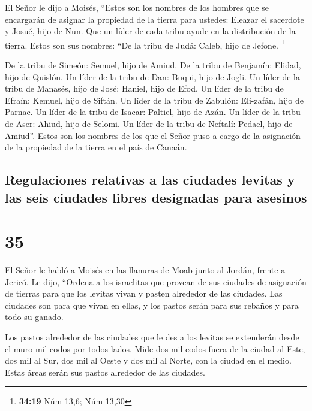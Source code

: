  El Señor le dijo a Moisés,  ``Estos son
los nombres de los hombres que se encargarán de asignar la propiedad de
la tierra para ustedes: Eleazar el sacerdote y Josué, hijo de Nun.
 Que un líder de cada tribu ayude en la distribución de
la tierra.  Estos son sus nombres: ``De la tribu de Judá:
Caleb, hijo de Jefone. \footnote{\textbf{34:19} Núm 13,6; Núm 13,30}

 De la tribu de Simeón: Semuel, hijo de Amiud.
 De la tribu de Benjamín: Elidad, hijo de Quislón.
 Un líder de la tribu de Dan: Buqui, hijo de Jogli.
 Un líder de la tribu de Manasés, hijo de José: Haniel,
hijo de Efod.  Un líder de la tribu de Efraín: Kemuel,
hijo de Siftán.  Un líder de la tribu de Zabulón:
Eli-zafán, hijo de Parnac.  Un líder de la tribu de
Isacar: Paltiel, hijo de Azán.  Un líder de la tribu de
Aser: Ahiud, hijo de Selomi.  Un líder de la tribu de
Neftalí: Pedael, hijo de Amiud''.  Estos son los nombres
de los que el Señor puso a cargo de la asignación de la propiedad de la
tierra en el país de Canaán.

\hypertarget{regulaciones-relativas-a-las-ciudades-levitas-y-las-seis-ciudades-libres-designadas-para-asesinos}{%
\subsection{Regulaciones relativas a las ciudades levitas y las seis
ciudades libres designadas para
asesinos}\label{regulaciones-relativas-a-las-ciudades-levitas-y-las-seis-ciudades-libres-designadas-para-asesinos}}

\hypertarget{section-34}{%
\section{35}\label{section-34}}

 El Señor le habló a Moisés en las llanuras de Moab junto
al Jordán, frente a Jericó. Le dijo,  ``Ordena a los
israelitas que provean de sus ciudades de asignación de tierras para que
los levitas vivan y pasten alrededor de las ciudades.  Las
ciudades son para que vivan en ellas, y los pastos serán para sus
rebaños y para todo su ganado.

 Los pastos alrededor de las ciudades que le des a los
levitas se extenderán desde el muro mil codos por todos lados.
 Mide dos mil codos fuera de la ciudad al Este, dos mil al
Sur, dos mil al Oeste y dos mil al Norte, con la ciudad en el medio.
Estas áreas serán sus pastos alrededor de las ciudades.

